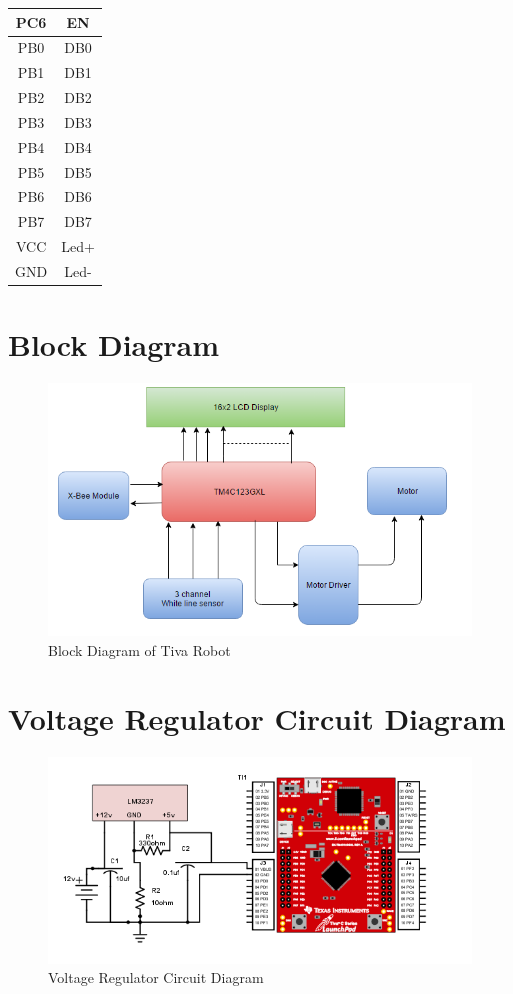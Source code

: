\documentclass[a4paper,12pt,oneside]{book}
\begin{document}
\begin {enumerate}
\begin{center}
\begin{tabular}{| c | c |}
		\hline
		PC6 & EN \\
		\hline
		PB0 & DB0\\
		\hline
		PB1 & DB1 \\
		\hline
		PB2 & DB2\\
		\hline
		PB3 & DB3 \\
		\hline
		PB4 & DB4 \\
		\hline
		PB5 & DB5 \\
		\hline
		PB6 & DB6 \\
		\hline
		PB7 & DB7 \\
		\hline
		VCC & Led+ \\
		\hline
		GND & Led- \\
		\hline
	\end{tabular}
\end{center}
\end{enumerate}
\newpage

 \section{Block Diagram}
 \begin{figure}[!h]
        \centering
        \includegraphics[scale=0.9]{block}
        \caption{Block Diagram of Tiva Robot}
      \end{figure}
      \newpage
      \section{Voltage Regulator Circuit Diagram}
 \begin{figure}[!h]
 	\centering
 	\includegraphics[scale=0.8]{LM3237}
 	\caption{Voltage Regulator Circuit Diagram}
 \end{figure}
\newpage
\end{document}
